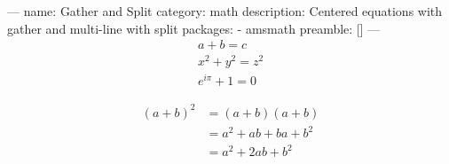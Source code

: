 ---
name: Gather and Split
category: math
description: Centered equations with gather and multi-line with split
packages:
  - amsmath
preamble: []
---
\begin{gather}
  a + b = c \\
  x^2 + y^2 = z^2 \\
  e^{i\pi} + 1 = 0
\end{gather}

\begin{equation}
\begin{split}
  (a + b)^2 &= (a + b)(a + b) \\
             &= a^2 + ab + ba + b^2 \\
             &= a^2 + 2ab + b^2
\end{split}
\end{equation}
